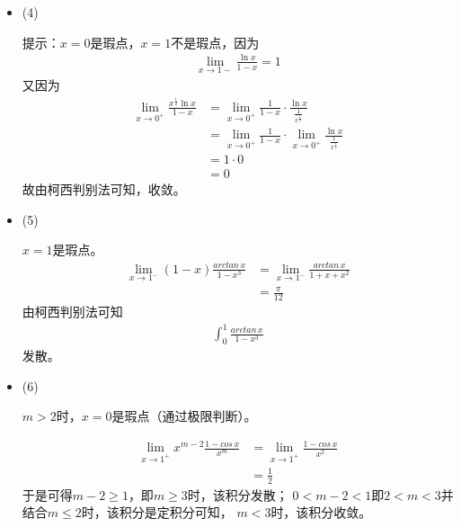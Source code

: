 \documentclass{article}
\begin{document}
\begin{itemize}
        综上，$\int_{0}^{1} \frac{dx}{\sqrt{x} \ln\, x}$发散。

  \item (4)

        提示：$x = 0$是瑕点，$x = 1$不是瑕点，因为
        \begin{align*}
          \lim\limits_{x \to 1-} \frac{\ln x}{1 - x} = 1
        \end{align*}
        又因为
        \begin{align*}
          \lim\limits_{x \to 0^+} \frac{x^{\frac{1}{2}} \ln x}{1 - x}
           & = \lim\limits_{x \to 0^+} \frac{1}{1 - x} \cdot \frac{\ln x}{\frac{1}{x^\frac{1}{2}}}                         \\
           & = \lim\limits_{x \to 0^+} \frac{1}{1 - x} \cdot \lim\limits_{x \to 0^+} \frac{\ln x}{\frac{1}{x^\frac{1}{2}}} \\
           & = 1 \cdot 0                                                                                                   \\
           & = 0
        \end{align*}
        故由柯西判别法可知，收敛。

  \item (5)

        $x = 1$是瑕点。
        \begin{align*}
          \lim\limits_{x \to 1^-} (1 - x) \frac{arctan\, x}{1 - x^3}
           & = \lim\limits_{x \to 1^-} \frac{arctan\, x}{1 + x + x^2} \\
           & = \frac{\pi}{12}
        \end{align*}
        由柯西判别法可知
        \begin{align*}
          \int_{0}^{1} \frac{arctan\, x}{1 - x^3}
        \end{align*}
        发散。

  \item (6)

        $m > 2$时，$x = 0$是瑕点（通过极限判断）。

        \begin{align*}
          \lim\limits_{x \to 1^+} x^{m - 2} \frac{1 - cos\, x}{x^m}
           & = \lim\limits_{x \to 1^+} \frac{1 - cos\, x}{x^2} \\
           & = \frac{1}{2}
        \end{align*}
        于是可得$m - 2 \geq 1$，即$m \geq 3$时，该积分发散；
        $0 < m - 2 < 1$即$2 < m < 3$并结合$m \leq 2$时，该积分是定积分可知，
        $m < 3$时，该积分收敛。


\end{itemize}
\end{document}
